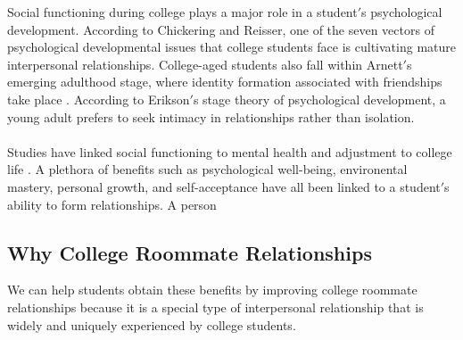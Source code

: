 \documentclass[journal]{./IEEE/IEEEtran}
\begin{document}
    Social functioning during college plays a major role in a student$'$s psychological development. According to Chickering and Reisser, one of the seven vectors of psychological developmental issues that college students face is cultivating mature interpersonal relationships\cite{chickering}. College-aged students also fall within Arnett$'$s emerging adulthood stage, where identity formation associated with friendships take place \cite{erb}. According to Erikson$'$s stage theory of psychological development, a young adult prefers to seek intimacy in relationships rather than isolation\cite{erikson}.
    \\
    \\
    Studies have linked social functioning to mental health and adjustment to college life \cite{erb}. A plethora of benefits such as psychological well-being, environental mastery, personal growth, and self-acceptance have all been linked to a student$'$s ability to form relationships\cite{erb}. A person


\subsection{Why College Roommate Relationships}
    We can help students obtain these benefits by improving college roommate relationships because it is a special type of interpersonal relationship that is widely and uniquely experienced by college students\cite{erb}.
\end{document}
